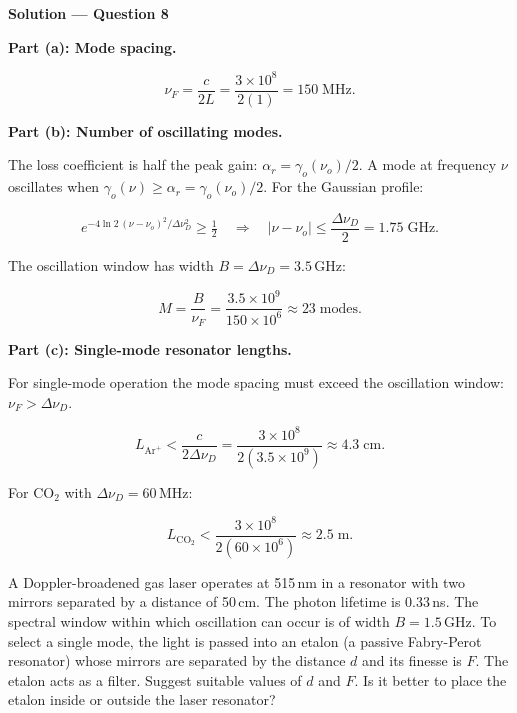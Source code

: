 \textbf{\large Solution --- Question 8}

\textbf{Part (a): Mode spacing.}

\begin{equation*}
  \nu_F = \frac{c}{2L} = \frac{3\times10^{8}}{2(1)} = \boxed{150\;\text{MHz}.}
\end{equation*}

\textbf{Part (b): Number of oscillating modes.}

The loss coefficient is half the peak gain: $\alpha_r = \gamma_o(\nu_o)/2$. A mode at frequency $\nu$ oscillates when $\gamma_o(\nu) \ge \alpha_r = \gamma_o(\nu_o)/2$. For the Gaussian profile:

\begin{equation*}
  e^{-4\ln2\,(\nu-\nu_o)^2/\Delta\nu_D^2} \ge \tfrac{1}{2}
  \quad\Longrightarrow\quad |\nu-\nu_o| \le \frac{\Delta\nu_D}{2} = 1.75\;\text{GHz}.
\end{equation*}

The oscillation window has width $B = \Delta\nu_D = 3.5$\,GHz:

\begin{equation*}
  M = \frac{B}{\nu_F} = \frac{3.5\times10^{9}}{150\times10^{6}} \approx \boxed{23\;\text{modes}.}
\end{equation*}

\textbf{Part (c): Single-mode resonator lengths.}

For single-mode operation the mode spacing must exceed the oscillation window: $\nu_F > \Delta\nu_D$.

\begin{equation*}
  L_{\text{Ar}^+} < \frac{c}{2\Delta\nu_D} = \frac{3\times10^{8}}{2(3.5\times10^{9})} \approx \boxed{4.3\;\text{cm}.}
\end{equation*}

For CO$_2$ with $\Delta\nu_D = 60$\,MHz:

\begin{equation*}
  L_{\text{CO}_2} < \frac{3\times10^{8}}{2(60\times10^{6})} \approx \boxed{2.5\;\text{m}.}
\end{equation*}


\begin{question}[Question 9]A Doppler-broadened gas laser operates at 515\,nm in a resonator with two
mirrors separated by a distance of 50\,cm. The photon lifetime is 0.33\,ns. The spectral window
within which oscillation can occur is of width $B=1.5$\,GHz. To select a single mode, the light
is passed into an etalon (a passive Fabry-Perot resonator) whose mirrors are separated by the
distance $d$ and its finesse is $F$. The etalon acts as a filter. Suggest suitable values of $d$
and $F$. Is it better to place the etalon inside or outside the laser resonator?
\end{question}

